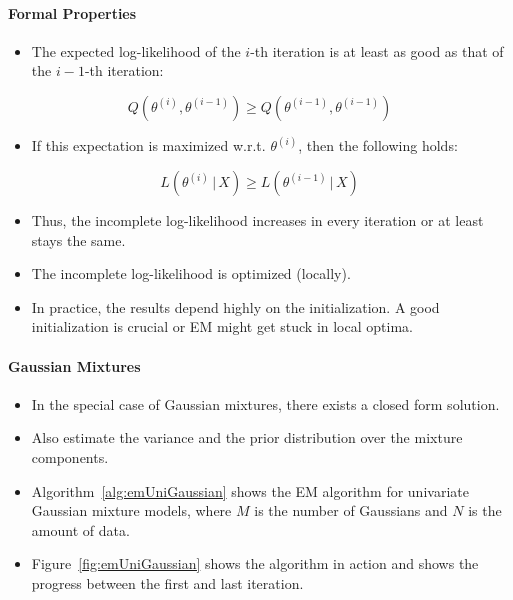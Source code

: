 \documentclass[a4paper, 11pt, accentcolor = tud3b]{tudreport}
\newcommand{\given}{\ensuremath{\,\vert\,}}
\begin{document}
					\paragraph{Formal Properties}
						\begin{itemize}
							\item The expected log-likelihood of the \(i\)-th iteration is at least as good as that of the \(i - 1\)-th iteration:
						\end{itemize}
						\begin{equation}
							Q(\theta^{(i)}, \theta^{(i - 1)}) \geq Q(\theta^{(i - 1)}, \theta^{(i - 1)})
						\end{equation}
						\begin{itemize}
							\item If this expectation is maximized w.r.t. \(\theta^{(i)}\), then the following holds:
						\end{itemize}
						\begin{equation}
							L(\theta^{(i)} \given X) \geq L(\theta^{(i - 1)} \given X)
						\end{equation}
						\begin{itemize}
							\item Thus, the incomplete log-likelihood increases in every iteration or at least stays the same.
							\item The incomplete log-likelihood is optimized (locally).
							\item In practice, the results depend highly on the initialization. A good initialization is crucial or EM might get stuck in local optima.
						\end{itemize}

					\paragraph{Gaussian Mixtures}
						\begin{itemize}
							\item In the special case of Gaussian mixtures, there exists a closed form solution.
							\item Also estimate the variance and the prior distribution over the mixture components.
							\item Algorithm~\ref{alg:emUniGaussian} shows the EM algorithm for univariate Gaussian mixture models, where \(M\) is the number of Gaussians and \(N\) is the amount of data.
							\item Figure~\ref{fig:emUniGaussian} shows the algorithm in action and shows the progress between the first and last iteration.
						\end{itemize}
\end{document}
